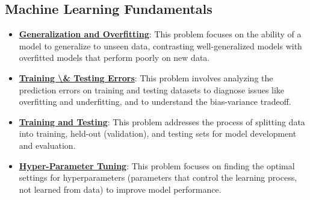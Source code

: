 \documentclass{article}%
\begin{document}
%
\subsection{Machine Learning Fundamentals}%
\label{subsec:MachineLearningFundamentals}%
\begin{itemize}[leftmargin=*]%
\item \href{https://purdue.brightspace.com/d2l/common/assets/pdfjs-d2l-dist/1.0.14-legacy/web/viewer.html?file=\%2Fcontent\%2Fenforced\%2F1095467-wl.202510.CS.24300.001\%2F10L1-CrossValidation.pdf\%3Fou\%3D1095467\&lang=en-us\&container=d2l-fileviewer-rendered-pdf\&fullscreen=d2l-fileviewer-rendered-pdf-dialog\&height=667#page=2}{\textbf{Generalization and Overfitting}}: This problem focuses on the ability of a model to generalize to unseen data, contrasting well-generalized models with overfitted models that perform poorly on new data.%
\item \href{https://purdue.brightspace.com/d2l/common/assets/pdfjs-d2l-dist/1.0.14-legacy/web/viewer.html?file=\%2Fcontent\%2Fenforced\%2F1095467-wl.202510.CS.24300.001\%2F10L1-CrossValidation.pdf\%3Fou\%3D1095467\&lang=en-us\&container=d2l-fileviewer-rendered-pdf\&fullscreen=d2l-fileviewer-rendered-pdf-dialog\&height=667#page=4}{\textbf{Training \textbackslash{}& Testing Errors}}: This problem involves analyzing the prediction errors on training and testing datasets to diagnose issues like overfitting and underfitting, and to understand the bias-variance tradeoff.%
\item \href{https://purdue.brightspace.com/d2l/common/assets/pdfjs-d2l-dist/1.0.14-legacy/web/viewer.html?file=\%2Fcontent\%2Fenforced\%2F1095467-wl.202510.CS.24300.001\%2F10L1-CrossValidation.pdf\%3Fou\%3D1095467\&lang=en-us\&container=d2l-fileviewer-rendered-pdf\&fullscreen=d2l-fileviewer-rendered-pdf-dialog\&height=667#page=5}{\textbf{Training and Testing}}: This problem addresses the process of splitting data into training, held-out (validation), and testing sets for model development and evaluation.%
\item \href{https://purdue.brightspace.com/d2l/common/assets/pdfjs-d2l-dist/1.0.14-legacy/web/viewer.html?file=\%2Fcontent\%2Fenforced\%2F1095467-wl.202510.CS.24300.001\%2F10L1-CrossValidation.pdf\%3Fou\%3D1095467\&lang=en-us\&container=d2l-fileviewer-rendered-pdf\&fullscreen=d2l-fileviewer-rendered-pdf-dialog\&height=667#page=14}{\textbf{Hyper-Parameter Tuning}}: This problem focuses on finding the optimal settings for hyperparameters (parameters that control the learning process, not learned from data) to improve model performance.%

\end{itemize}
\end{document}
